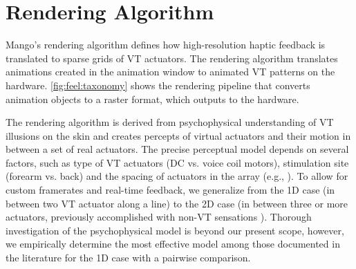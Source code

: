 
    
    
    
%
%
\section{Rendering Algorithm}
Mango's rendering algorithm defines how high-resolution haptic feedback is translated to %
 sparse grids of VT actuators. 
The rendering algorithm translates animations created in the animation window to animated VT patterns on the hardware.
\autoref{fig:feel:taxonomy} shows the rendering pipeline that converts animation objects to
a raster format, which outputs to the hardware.

The rendering algorithm is derived from %
psychophysical understanding of VT illusions on the skin and creates percepts of virtual actuators and their motion in between a set of real actuators.
The precise perceptual model depends on several factors, such as type of VT actuators (DC vs. voice coil motors), stimulation site (forearm vs. back) and the spacing of actuators in the array (e.g., \cite{Israr2011a}).
To allow for custom framerates and real-time feedback, we generalize from the 1D case (in between two VT actuator along a line) to the 2D case (in between three or more actuators, previously accomplished with non-VT sensations \cite{Tanie1980}).
Thorough investigation of the psychophysical model is beyond our present scope, however, we empirically determine 
the most effective model among those  %
 documented in the literature for the 1D case with a 
pairwise comparison.

